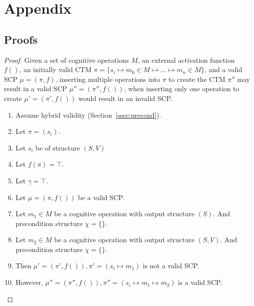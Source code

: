\chapter*{Appendix} \label{chp:appendix}
\section*{Proofs}

\begin{proof} \label{proof:insertionSearch}
Given a set of cognitive operations $M$, an external activation function $f()$, an initially valid CTM $\pi=\{s_i \longmapsto m_0\in M \longmapsto ... \longmapsto m_n\in M\}$, and a valid SCP $\mu=(\pi,f)$, inserting multiple operations into $\pi$ to create the CTM $\pi''$ may result in a valid SCP $\mu''=(\pi'',f())$, when inserting only one operation to create $\mu'=(\pi',f())$ would result in an invalid SCP.

\begin{enumerate}
\item Assume hybrid validity (Section~\ref{ssec:precond}).
\item Let $\pi=(s_i)$.
\item Let $s_i$ be of structure $(S,V)$
\item Let $f(\pi)=\top$.
\item Let $\gamma = \top$.
\item Let $\mu=(\pi,f())$ be a valid SCP.
\item Let $m_1 \in M$ be a cognitive operation with output structure $(S)$. And precondition structure $\chi=\{\}$.
\item Let $m_2 \in M$ be a cognitive operation with output structure $(S,V)$. And precondition structure $\chi=\{\}$.
\item Then $\mu'=(\pi',f()), \pi'=(s_i \longmapsto m_1)$ is not a valid SCP.
\item However, $\mu''=(\pi'',f()), \pi''=(s_i \longmapsto m_1 \longmapsto m_2)$ is a valid SCP.
\end{enumerate}
\end{proof}








